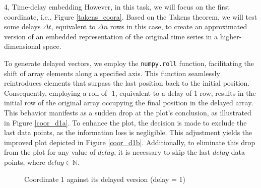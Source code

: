 \begin{task}{4, Time-delay embedding}
However, in this task, we will focus on the first coordinate, i.e., Figure \ref{takens_coora}. Based on the Takens theorem, we will test some delays \(\Delta t\), equivalent to \(\Delta n\) rows in this case, to create an approximated version of an embedded representation of the original time series in a higher-dimensional space.


To generate delayed vectors, we employ the \verb|numpy.roll| function, facilitating the shift of array elements along a specified axis. This function seamlessly reintroduces elements that surpass the last position back to the initial position. Consequently, employing a roll of -1, equivalent to a delay of 1 row, results in the initial row of the original array occupying the final position in the delayed array. This behavior manifests as a sudden drop at the plot's conclusion, as illustrated in Figure \ref{coor_d1a}. To enhance the plot, the decision is made to exclude the last data points, as the information loss is negligible. This adjustment yields the improved plot depicted in Figure \ref{coor_d1b}. Additionally, to eliminate this drop from the plot for any value of \(delay\), it is necessary to skip the last \(delay\) data points, where \(delay \in \mathbb{N}\).

\begin{figure}[H]
\centering
{}
\caption{Coordinate 1 against its delayed version (delay = 1)}
\label{coor_d1}
\end{figure}



\end{task}
